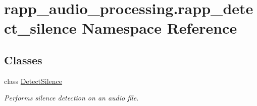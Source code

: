 \hypertarget{namespacerapp__audio__processing_1_1rapp__detect__silence}{\section{rapp\-\_\-audio\-\_\-processing.\-rapp\-\_\-detect\-\_\-silence Namespace Reference}
\label{namespacerapp__audio__processing_1_1rapp__detect__silence}
}
\subsection*{Classes}
\begin{DoxyCompactItemize}
\item 
class \hyperlink{classrapp__audio__processing_1_1rapp__detect__silence_1_1DetectSilence}{Detect\-Silence}
\begin{DoxyCompactList}\small\item\em Performs silence detection on an audio file. \end{DoxyCompactList}\end{DoxyCompactItemize}
